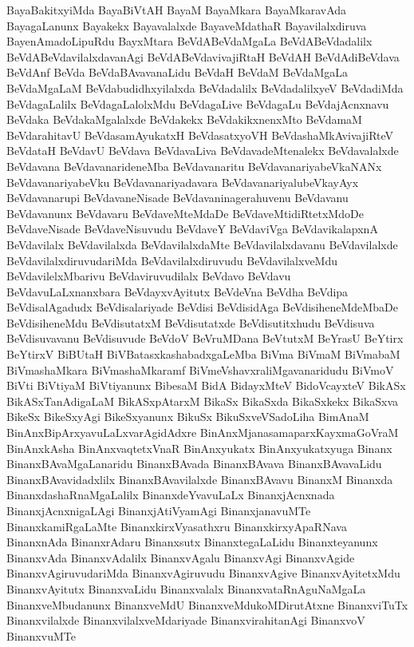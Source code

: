 {BayaBakitxyiMda
BayaBiVtAH
BayaM
BayaMkara
BayaMkaravAda
BayagaLanunx
Bayakekx
Bayavalalxde
BayaveMdathaR
Bayavilalxdiruva
BayenAmadoLipuRdu
BayxMtara
BeVdABeVdaMgaLa
BeVdABeVdadalilx
BeVdABeVdavilalxdavanAgi
BeVdABeVdavivajiRtaH
BeVdAH
BeVdAdiBeVdava
BeVdAnf
BeVda
BeVdaBAvavanaLidu
BeVdaH
BeVdaM
BeVdaMgaLa
BeVdaMgaLaM
BeVdabudidhxyilalxda
BeVdadalilx
BeVdadalilxyeV
BeVdadiMda
BeVdagaLalilx
BeVdagaLalolxMdu
BeVdagaLive
BeVdagaLu
BeVdajAcnxnavu
BeVdaka
BeVdakaMgalalxde
BeVdakekx
BeVdakikxnenxMto
BeVdamaM
BeVdarahitavU
BeVdasamAyukatxH
BeVdasatxyoVH
BeVdashaMkAvivajiRteV
BeVdataH
BeVdavU
BeVdava
BeVdavaLiva
BeVdavadeMtenalekx
BeVdavalalxde
BeVdavana
BeVdavanarideneMba
BeVdavanaritu
BeVdavanariyabeVkaNANx
BeVdavanariyabeVku
BeVdavanariyadavara
BeVdavanariyalubeVkayAyx
BeVdavanarupi
BeVdavaneNisade
BeVdavaninagerahuvenu
BeVdavanu
BeVdavanunx
BeVdavaru
BeVdaveMteMdaDe
BeVdaveMtidiRtetxMdoDe
BeVdaveNisade
BeVdaveNisuvudu
BeVdaveY
BeVdaviVga
BeVdavikalapxnA
BeVdavilalx
BeVdavilalxda
BeVdavilalxdaMte
BeVdavilalxdavanu
BeVdavilalxde
BeVdavilalxdiruvudariMda
BeVdavilalxdiruvudu
BeVdavilalxveMdu
BeVdavilelxMbarivu
BeVdaviruvudilalx
BeVdavo
BeVdavu
BeVdavuLaLxnanxbara
BeVdayxvAyitutx
BeVdeVna
BeVdha
BeVdipa
BeVdisalAgadudx
BeVdisalariyade
BeVdisi
BeVdisidAga
BeVdisiheneMdeMbaDe
BeVdisiheneMdu
BeVdisutatxM
BeVdisutatxde
BeVdisutitxhudu
BeVdisuva
BeVdisuvavanu
BeVdisuvude
BeVdoV
BeVruMDana
BeVtutxM
BeYrasU
BeYtirx
BeYtirxV
BiBUtaH
BiVBatasxkashabadxgaLeMba
BiVma
BiVmaM
BiVmabaM
BiVmashaMkara
BiVmashaMkaramf
BiVmeVshavxraliMgavanaridudu
BiVmoV
BiVti
BiVtiyaM
BiVtiyanunx
BibesaM
BidA
BidayxMteV
BidoVcayxteV
BikASx
BikASxTanAdigaLaM
BikASxpAtarxM
BikaSx
BikaSxda
BikaSxkekx
BikaSxva
BikeSx
BikeSxyAgi
BikeSxyanunx
BikuSx
BikuSxveVSadoLiha
BimAnaM
BinAnxBipArxyavuLaLxvarAgidAdxre
BinAnxMjanasamaparxKayxmaGoVraM
BinAnxkAsha
BinAnxvaqtetxVnaR
BinAnxyukatx
BinAnxyukatxyuga
Binanx
BinanxBAvaMgaLanaridu
BinanxBAvada
BinanxBAvava
BinanxBAvavaLidu
BinanxBAvavidadxlilx
BinanxBAvavilalxde
BinanxBAvavu
BinanxM
Binanxda
BinanxdashaRnaMgaLalilx
BinanxdeYvavuLaLx
BinanxjAcnxnada
BinanxjAcnxnigaLAgi
BinanxjAtiVyamAgi
BinanxjanavuMTe
BinanxkamiRgaLaMte
BinanxkirxVyasathxru
BinanxkirxyApaRNava
BinanxnAda
BinanxrAdaru
Binanxsutx
BinanxtegaLaLidu
Binanxteyanunx
BinanxvAda
BinanxvAdalilx
BinanxvAgalu
BinanxvAgi
BinanxvAgide
BinanxvAgiruvudariMda
BinanxvAgiruvudu
BinanxvAgive
BinanxvAyitetxMdu
BinanxvAyitutx
BinanxvaLidu
Binanxvalalx
BinanxvataRnAguNaMgaLa
BinanxveMbudanunx
BinanxveMdU
BinanxveMdukoMDirutAtxne
BinanxviTuTx
Binanxvilalxde
BinanxvilalxveMdariyade
BinanxvirahitanAgi
BinanxvoV
BinanxvuMTe
}
